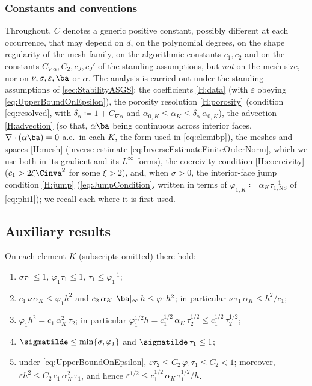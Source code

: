 \subsubsection{Constants and conventions}\label{sec:assumptions}
Throughout, $C$ denotes a generic positive constant, possibly different at each occurrence,
that may depend on $d$, on the polynomial degrees, on the shape regularity of the mesh
family, on the algorithmic constants $c_1,c_2$ and on the constants
$C_{\nabla\alpha},C_2,c_J,c_J'$ of the standing assumptions, but \emph{not} on the mesh size,
nor on $\nu,\sigma,\varepsilon,\ba$ or $\alpha$. The analysis is carried out under the
standing assumptions of \cref{sec:StabilityASGS}: the coefficients \cref{H:data} (with
$\varepsilon$ obeying \cref{eq:UpperBoundOnEpsilon}), the porosity resolution \cref{H:porosity}
(condition \cref{eq:resolved}, with $\delta_\alpha\coloneqq 1+C_{\nabla\alpha}$ and
$\alpha_{0,K}\le\alpha_K\le\delta_\alpha\,\alpha_{0,K}$), the advection \cref{H:advection}
(so that, $\alpha\ba$ being continuous across interior faces, $\nabla\cdot(\alpha\ba)=0$
a.e.\ in each $K$, the form used in \cref{eq:elemibp}), the meshes and spaces \cref{H:mesh}
(inverse estimate \cref{eq:InverseEstimateFiniteOrderNorm}, which we use both in its
gradient and its $L^\infty$ forms), the coercivity condition \cref{H:coercivity}
($c_1>2\xi\Cinva^2$ for some $\xi>2$), and, when $\sigma>0$, the interior-face jump condition
\cref{H:jump} (\cref{eq:JumpCondition}, written in terms of
$\varphi_{1,K}\coloneqq\alpha_K\tau_{1,\mathrm{NS}}^{-1}$ of \cref{eq:phi1}); we recall each
where it is first used.

\subsection{Auxiliary results}\label{sec:auxiliary}

\begin{lemma}\label{lem:parameters}
On each element $K$ (subscripts omitted) there hold:
\begin{enumerate}[label=\textup{(P\arabic*)},leftmargin=3.2em]
  \item\label{P:basic}
  $\sigma\tau_1\le 1$, $\varphi_1\tau_1\le 1$, $\tau_1\le \varphi_1^{-1}$;
  \item\label{P:components}
  $c_1\,\nu\,\alpha_K\le \varphi_1 h^2$ and
  $c_2\,\alpha_K\,|\ba|_{\infty}\,h\le \varphi_1 h^2$; in particular
  $\nu\,\tau_1\,\alpha_K\le h^2/c_1$;
  \item\label{P:27}
  $\varphi_1 h^2 = c_1\,\alpha_K^2\,\tau_2$; in particular
  $\varphi_1^{1/2} h = c_1^{1/2}\,\alpha_K\,\tau_2^{1/2}
  \le c_1^{1/2}\,\tau_2^{1/2}$;
  \item\label{P:sigmatilde}
  $\sigmatilde\le\min\{\sigma,\varphi_1\}$ and
  $\sigmatilde\,\tau_1\le 1$;
  \item\label{P:eps}
  under \eqref{eq:UpperBoundOnEpsilon}, $\varepsilon\tau_2\le C_2\,\varphi_1\tau_1\le C_2<1$;
  moreover, $\varepsilon h^2\le C_2\,c_1\,\alpha_K^2\,\tau_1$, and hence
  $\varepsilon^{1/2}\le c_1^{1/2}\,\alpha_K\,\tau_1^{1/2}/h$.
\end{enumerate}
\end{lemma}

